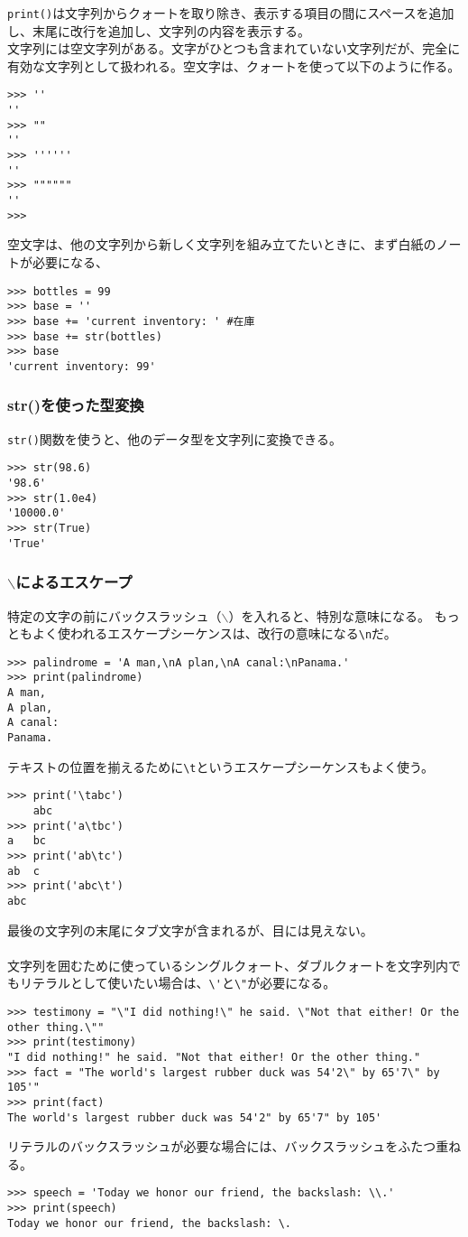 \documentclass[11pt, oneside]{article}   	%
\begin{document}
\verb|print()|は文字列からクォートを取り除き、表示する項目の間にスペースを追加し、末尾に改行を追加し、文字列の内容を表示する。
　\\
文字列には空文字列がある。文字がひとつも含まれていない文字列だが、完全に有効な文字列として扱われる。空文字は、クォートを使って以下のように作る。
\begin{lstlisting}
>>> ''
''
>>> ""
''
>>> ''''''
''
>>> """"""
''
>>>
\end{lstlisting}
空文字は、他の文字列から新しく文字列を組み立てたいときに、まず白紙のノートが必要になる、
\begin{lstlisting}
>>> bottles = 99
>>> base = ''
>>> base += 'current inventory: ' #在庫
>>> base += str(bottles)
>>> base
'current inventory: 99'
\end{lstlisting}

\subsubsection{str()を使った型変換}
\verb|str()|関数を使うと、他のデータ型を文字列に変換できる。
\begin{lstlisting}
>>> str(98.6)
'98.6'
>>> str(1.0e4)
'10000.0'
>>> str(True)
'True'
\end{lstlisting}

\subsubsection{$\backslash$によるエスケープ}
特定の文字の前にバックスラッシュ（$\backslash$）を入れると、特別な意味になる。
もっともよく使われるエスケープシーケンスは、改行の意味になる\verb|\n|だ。
\begin{lstlisting}
>>> palindrome = 'A man,\nA plan,\nA canal:\nPanama.'
>>> print(palindrome)
A man,
A plan,
A canal:
Panama.
\end{lstlisting}
テキストの位置を揃えるために\verb|\t|というエスケープシーケンスもよく使う。
\begin{lstlisting}
>>> print('\tabc')
	abc
>>> print('a\tbc')
a	bc
>>> print('ab\tc')
ab	c
>>> print('abc\t')
abc
\end{lstlisting}
最後の文字列の末尾にタブ文字が含まれるが、目には見えない。\\
　\\
文字列を囲むために使っているシングルクォート、ダブルクォートを文字列内でもリテラルとして使いたい場合は、\verb|\'|と\verb|\"|が必要になる。
\begin{lstlisting}
>>> testimony = "\"I did nothing!\" he said. \"Not that either! Or the other thing.\""
>>> print(testimony)
"I did nothing!" he said. "Not that either! Or the other thing."
>>> fact = "The world's largest rubber duck was 54'2\" by 65'7\" by 105'"
>>> print(fact)
The world's largest rubber duck was 54'2" by 65'7" by 105'
\end{lstlisting}
リテラルのバックスラッシュが必要な場合には、バックスラッシュをふたつ重ねる。
\begin{lstlisting}
>>> speech = 'Today we honor our friend, the backslash: \\.'
>>> print(speech)
Today we honor our friend, the backslash: \.
\end{lstlisting}
\end{document}

